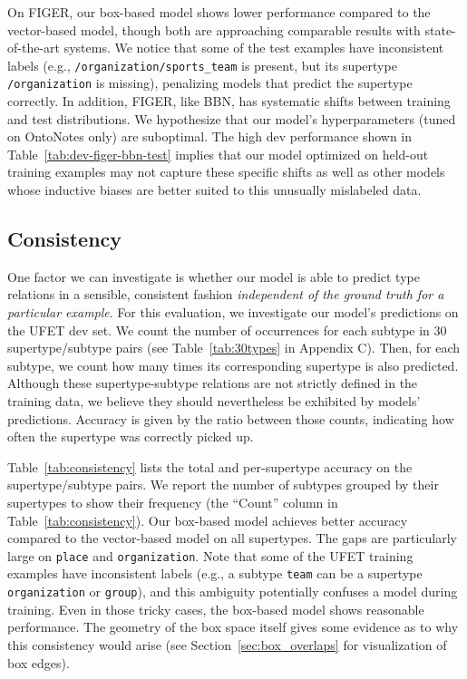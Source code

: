 \documentclass[11pt,a4paper]{article}
\begin{document}
On FIGER, our box-based model shows lower performance compared to the vector-based model, though both are approaching comparable results with state-of-the-art systems. We notice that some of the test examples have inconsistent labels  (e.g., {\tt /organization/sports\_team} is present, but its supertype {\tt /organization} is missing), penalizing models that predict the supertype correctly. In addition, FIGER, like BBN, has systematic shifts between training and test distributions. We hypothesize that our model's hyperparameters (tuned on OntoNotes only) are suboptimal. The high dev performance shown in Table~\ref{tab:dev-figer-bbn-test} implies that our model optimized on held-out training examples may not capture these specific shifts as well as other models whose inductive biases are better suited to this unusually mislabeled data.



\subsection{Consistency}

One factor we can investigate is whether our model is able to predict type relations in a sensible, consistent fashion \emph{independent of the ground truth for a particular example}. For this evaluation, we investigate our model's predictions on the UFET dev set. We count the number of occurrences for each subtype in 30 supertype/subtype pairs (see Table~\ref{tab:30types} in Appendix C). Then, for each subtype, we count how many times its corresponding supertype is also predicted. Although these supertype-subtype relations are not strictly defined in the training data, we believe they should nevertheless be exhibited by models' predictions. Accuracy is given by the ratio between those counts, indicating how often the supertype was correctly picked up.

Table~\ref{tab:consistency} lists the total and per-supertype accuracy on the supertype/subtype pairs. We report the number of subtypes grouped by their supertypes to show their frequency (the ``Count'' column in Table~\ref{tab:consistency}). Our box-based model achieves better accuracy compared to the vector-based model on all supertypes. The gaps are particularly large on {\tt place} and {\tt organization}. Note that some of the UFET training examples have inconsistent labels (e.g., a subtype {\tt team} can be a supertype {\tt organization} or {\tt group}), and this ambiguity potentially confuses a model during training. Even in those tricky cases, the box-based model shows reasonable performance. The geometry of the box space itself gives some evidence as to why this consistency would arise (see Section~\ref{sec:box_overlaps} for visualization of box edges).
\end{document}
